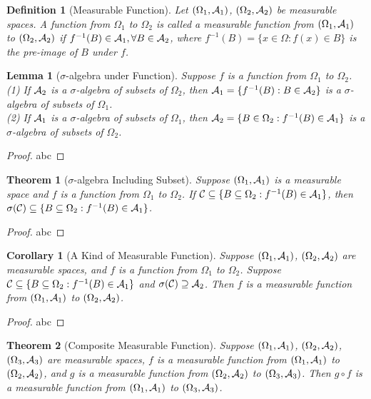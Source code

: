 \documentclass[openany,12pt]{book}
\newtheorem{theorem}{Theorem}[chapter]
\newtheorem{corollary}{Corollary}[chapter]
\newtheorem{lemma}{Lemma}[chapter]
\newtheorem{definition}{Definition}[chapter]
\begin{document}
\begin{definition}[Measurable Function]
Let $(\Omega_1,\mathcal{A}_1)$, $(\Omega_2,\mathcal{A}_2)$ be measurable spaces. A function from $\Omega_1$ to $\Omega_2$ is called a measurable function from $(\Omega_1,\mathcal{A}_1)$ to  $(\Omega_2,\mathcal{A}_2)$ if $f^{-1}(B)\in \mathcal{A}_1,\forall B\in\mathcal{A}_2$, where $f^{-1} (B)=\{x\in\Omega:f(x)\in B\}$ is the 
pre-image of $B$ under $f$.
\end{definition}

\begin{lemma}[$\sigma$-algebra under Function]
Suppose $f$ is a function from $\Omega_1$ to $\Omega_2$.\\
(1) If $\mathcal{A}_2$ is a $\sigma$-algebra of subsets of  $\Omega_2$, then $\mathcal{A}_1=\{f^{-1} (B):B\in\mathcal{A} _2\}$ is a $\sigma$-algebra of subsets of $\Omega_1$.\\
(2) If $\mathcal{A}_1$ is a $\sigma$-algebra of subsets of $\Omega_1$, then $\mathcal{A}_2=\{B\in\Omega_2:f^{-1} (B)\in\mathcal{A}_1\}$ is a $\sigma$-algebra of subsets of $\Omega_2$.
\end{lemma}

\begin{proof}
  abc
\end{proof}

\begin{theorem}[$\sigma$-algebra Including Subset]
Suppose $(\Omega_1,\mathcal{A}_1)$ is a measurable space and $f$ is a function from $\Omega_1$ to $\Omega_2$. If $\mathcal{C}\subseteq\{B\subseteq\Omega_2: f^{-1} (B)\in\mathcal{A}_1\}$, then $\sigma(\mathcal{C})\subseteq\{B\subseteq\Omega_2: f^{-1} (B)\in\mathcal{A}_1\}$.
\end{theorem}

\begin{proof}
  abc
\end{proof}

\begin{corollary}[A Kind of Measurable Function]
Suppose $(\Omega_1,\mathcal{A}_1)$, $(\Omega_2,\mathcal{A}_2)$ are measurable spaces, and $f$ is a function from $\Omega_1$ to $\Omega_2$. Suppose $\mathcal{C}\subseteq\{B\subseteq\Omega_2: f^{-1} (B)\in\mathcal{A}_1\}$ and $\sigma(\mathcal{C})\supseteq\mathcal{A}_2$. Then $f$ is a measurable function from $(\Omega_1,\mathcal{A}_1)$ to $(\Omega_2,\mathcal{A}_2)$.
\end{corollary}

\begin{proof}
  abc
\end{proof}

\begin{theorem}[Composite Measurable Function]
Suppose $(\Omega_1,\mathcal{A}_1)$, $(\Omega_2,\mathcal{A}_2)$, $(\Omega_3,\mathcal{A}_3)$ are measurable spaces, $f$ is a measurable function from $(\Omega_1,\mathcal{A}_1)$ to $(\Omega_2,\mathcal{A}_2)$, and $g$ is a measurable function from $(\Omega_2,\mathcal{A}_2)$ to $(\Omega_3,\mathcal{A}_3)$. Then $g\circ f$ is a measurable function from  $(\Omega_1,\mathcal{A}_1)$ to $(\Omega_3,\mathcal{A}_3)$.
\end{theorem}
\end{document}

